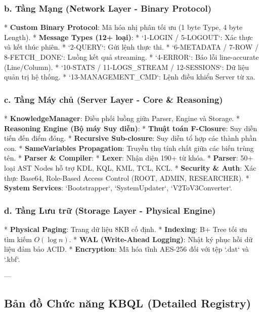 \subsubsection{b. Tầng Mạng (Network Layer - Binary Protocol)}

*   \textbf{Custom Binary Protocol}: Mã hóa nhị phân tối ưu (1 byte Type, 4 byte Length).
*   \textbf{Message Types (12+ loại)}: 
    *   `1-LOGIN / 5-LOGOUT`: Xác thực và kết thúc phiên.
    *   `2-QUERY`: Gửi lệnh thực thi.
    *   `6-METADATA / 7-ROW / 8-FETCH\_DONE`: Luồng kết quả streaming.
    *   `4-ERROR`: Báo lỗi line-accurate (Line/Column).
    *   `10-STATS / 11-LOGS\_STREAM / 12-SESSIONS`: Dữ liệu quản trị hệ thống.
    *   `13-MANAGEMENT\_CMD`: Lệnh điều khiển Server từ xa.

\subsubsection{c. Tầng Máy chủ (Server Layer - Core & Reasoning)}

*   \textbf{KnowledgeManager}: Điều phối luồng giữa Parser, Engine và Storage.
*   \textbf{Reasoning Engine (Bộ máy Suy diễn)}:
    *   \textbf{Thuật toán F-Closure}: Suy diễn tiến đến điểm đóng.
    *   \textbf{Recursive Sub-closure}: Suy diễn tổ hợp các thành phần con.
    *   \textbf{SameVariables Propagation}: Truyền thụ tính chất giữa các biến trùng tên.
*   \textbf{Parser \& Compiler}:
    *   \textbf{Lexer}: Nhận diện 190+ từ khóa.
    *   \textbf{Parser}: 50+ loại AST Nodes hỗ trợ KDL, KQL, KML, TCL, KCL.
*   \textbf{Security \& Auth}: Xác thực Base64, Role-Based Access Control (ROOT, ADMIN, RESEARCHER).
*   \textbf{System Services}: `Bootstrapper`, `SystemUpdater`, `V2ToV3Converter`.

\subsubsection{d. Tầng Lưu trữ (Storage Layer - Physical Engine)}

*   \textbf{Physical Paging}: Trang dữ liệu 8KB cố định.
*   \textbf{Indexing}: B+ Tree tối ưu tìm kiếm $O(\log n)$.
*   \textbf{WAL (Write-Ahead Logging)}: Nhật ký phục hồi dữ liệu đảm bảo ACID.
*   \textbf{Encryption}: Mã hóa tĩnh AES-256 đối với tệp `.dat` và `.kbf`.

---

\subsection{Bản đồ Chức năng KBQL (Detailed Registry)}

